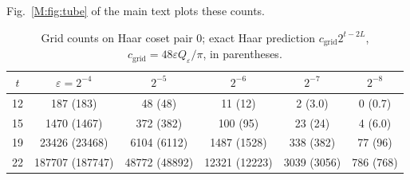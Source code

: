 \documentclass[aps,prx,twocolumn,superscriptaddress,nofootinbib,longbibliography]{revtex4-2}
\theoremstyle{plain}
\theoremstyle{definition}
\theoremstyle{remark}
\begin{document}
Fig.~\ref{M:fig:tube} of the main text plots these counts.

\begin{table}[t]
\centering\scriptsize
\caption{Grid counts on Haar coset pair 0; exact Haar prediction $c_{\mathrm{grid}}2^{t-2L}$, $c_{\mathrm{grid}}=48\varepsilon Q_\varepsilon/\pi$, in parentheses.}
\label{tab:counts}
\setlength{\tabcolsep}{1pt}\begin{tabular}{@{}c ccccc@{}}
\toprule
$t$ & $\varepsilon=2^{-4}$ & $2^{-5}$ & $2^{-6}$ & $2^{-7}$ & $2^{-8}$\\
\midrule
12 & 187 (183) & 48 (48) & 11 (12) & 2 (3.0) & 0 (0.7)\\
15 & 1470 (1467) & 372 (382) & 100 (95) & 23 (24) & 4 (6.0)\\
19 & 23426 (23468) & 6104 (6112) & 1487 (1528) & 338 (382) & 77 (96)\\
22 & 187707 (187747) & 48772 (48892) & 12321 (12223) & 3039 (3056) & 786 (768)\\
\bottomrule
\end{tabular}
\end{table}
\end{document}
